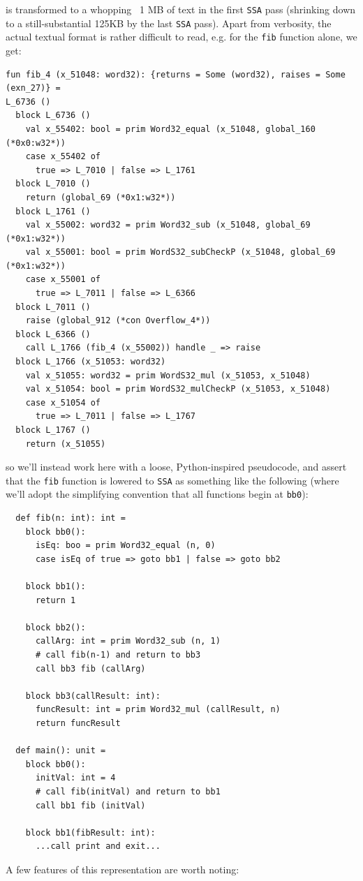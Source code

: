 \documentclass[leqno,11pt]{article}
\begin{document}
is transformed to a whopping ~1 MB of text in the first \texttt{SSA} pass
(shrinking down to a still-substantial 125KB by the last \texttt{SSA} pass).
Apart from verbosity, the actual textual format is rather difficult to read,
e.g. for the \texttt{fib} function alone, we get:
\begin{verbatim}
fun fib_4 (x_51048: word32): {returns = Some (word32), raises = Some (exn_27)} =
L_6736 ()
  block L_6736 ()
    val x_55402: bool = prim Word32_equal (x_51048, global_160 (*0x0:w32*))
    case x_55402 of
      true => L_7010 | false => L_1761
  block L_7010 ()
    return (global_69 (*0x1:w32*))
  block L_1761 ()
    val x_55002: word32 = prim Word32_sub (x_51048, global_69 (*0x1:w32*))
    val x_55001: bool = prim WordS32_subCheckP (x_51048, global_69 (*0x1:w32*))
    case x_55001 of
      true => L_7011 | false => L_6366
  block L_7011 ()
    raise (global_912 (*con Overflow_4*))
  block L_6366 ()
    call L_1766 (fib_4 (x_55002)) handle _ => raise
  block L_1766 (x_51053: word32)
    val x_51055: word32 = prim WordS32_mul (x_51053, x_51048)
    val x_51054: bool = prim WordS32_mulCheckP (x_51053, x_51048)
    case x_51054 of
      true => L_7011 | false => L_1767
  block L_1767 ()
    return (x_51055)
\end{verbatim}
so we'll instead work here with a loose, Python-inspired pseudocode, and assert
that the \texttt{fib} function is lowered to \texttt{SSA} as something like the
following (where we'll adopt the simplifying convention that all functions begin
at \texttt{bb0}):
\begin{verbatim}
  def fib(n: int): int =
    block bb0():
      isEq: boo = prim Word32_equal (n, 0)
      case isEq of true => goto bb1 | false => goto bb2

    block bb1():
      return 1

    block bb2():
      callArg: int = prim Word32_sub (n, 1)
      # call fib(n-1) and return to bb3
      call bb3 fib (callArg)

    block bb3(callResult: int):
      funcResult: int = prim Word32_mul (callResult, n)
      return funcResult

  def main(): unit =
    block bb0():
      initVal: int = 4
      # call fib(initVal) and return to bb1
      call bb1 fib (initVal)

    block bb1(fibResult: int):
      ...call print and exit...
\end{verbatim}
A few features of this representation are worth noting:
\end{document}
